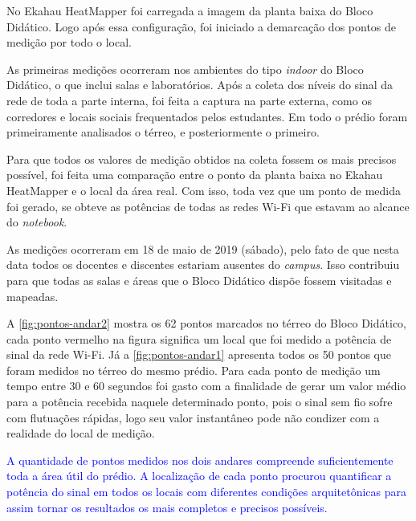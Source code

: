 No Ekahau HeatMapper foi carregada a imagem da planta baixa do Bloco Didático. Logo após essa configuração, foi iniciado a demarcação dos pontos de medição por todo o local.

As primeiras medições ocorreram nos ambientes do tipo \textit{indoor} do Bloco Didático, o que inclui salas e laboratórios. Após a coleta dos níveis do sinal da rede de toda a parte interna, foi feita a captura na parte externa, como os corredores e locais sociais frequentados pelos estudantes. Em todo o prédio foram primeiramente analisados o térreo, e posteriormente o primeiro.

Para que todos os valores de medição obtidos na coleta fossem os mais precisos possível, foi feita uma comparação entre o ponto da planta baixa no Ekahau HeatMapper e o local da área real. Com isso, toda vez que um ponto de medida foi gerado, se obteve as potências de todas as redes Wi-Fi que estavam ao alcance do \textit{notebook}.

As medições ocorreram em 18 de maio de 2019 (sábado), pelo fato de que nesta data todos os docentes e discentes estariam ausentes do \textit{campus}. Isso contribuiu para que todas as salas e áreas que o Bloco Didático dispõe fossem visitadas e mapeadas.

A \autoref{fig:pontos-andar2} mostra os 62 pontos marcados no térreo do Bloco Didático, cada ponto vermelho na figura significa um local que foi medido a potência de sinal da rede Wi-Fi. Já a \autoref{fig:pontos-andar1} apresenta todos os 50 pontos que foram medidos no térreo do mesmo prédio. Para cada ponto de medição um tempo entre 30 e 60 segundos foi gasto com a finalidade de gerar um valor médio para a potência recebida naquele determinado ponto, pois o sinal sem fio sofre com flutuações rápidas, logo seu valor instantâneo pode não condizer com a realidade do local de medição.

\textcolor{blue}{A quantidade de pontos medidos nos dois andares compreende suficientemente toda a área útil do prédio. A localização de cada ponto procurou quantificar a potência do sinal em todos os locais com diferentes condições arquitetônicas para assim tornar os resultados os mais completos e precisos possíveis.}

\begin{figure}[H]
	\centering
\end{figure}

